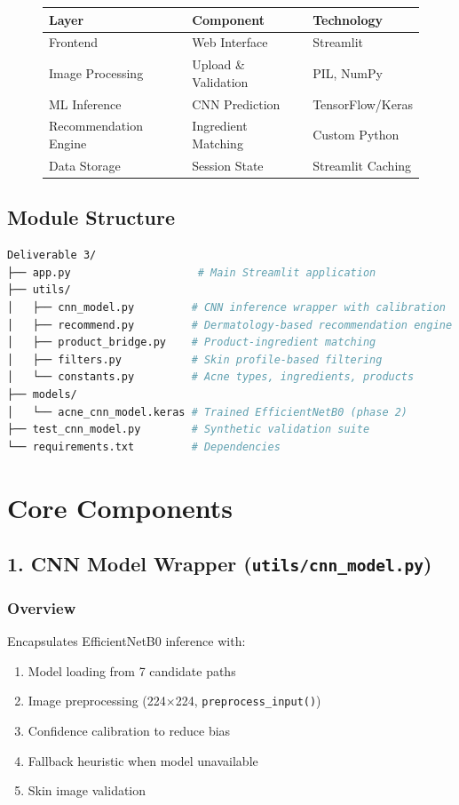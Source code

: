 \documentclass[12pt,a4paper]{article}
\begin{document}
\begin{figure}[H]
    \centering
    \begin{tabular}{|l|l|l|}
    \hline
    \textbf{Layer} & \textbf{Component} & \textbf{Technology} \\
    \hline
    Frontend & Web Interface & Streamlit \\
    Image Processing & Upload \& Validation & PIL, NumPy \\
    ML Inference & CNN Prediction & TensorFlow/Keras \\
    Recommendation Engine & Ingredient Matching & Custom Python \\
    Data Storage & Session State & Streamlit Caching \\
    \hline
    \end{tabular}
\end{figure}

\subsection{Module Structure}

\begin{lstlisting}[language=bash]
Deliverable 3/
├── app.py                    # Main Streamlit application
├── utils/
│   ├── cnn_model.py         # CNN inference wrapper with calibration
│   ├── recommend.py         # Dermatology-based recommendation engine
│   ├── product_bridge.py    # Product-ingredient matching
│   ├── filters.py           # Skin profile-based filtering
│   └── constants.py         # Acne types, ingredients, products
├── models/
│   └── acne_cnn_model.keras # Trained EfficientNetB0 (phase 2)
├── test_cnn_model.py        # Synthetic validation suite
└── requirements.txt         # Dependencies
\end{lstlisting}

\section{Core Components}

\subsection{1. CNN Model Wrapper (\texttt{utils/cnn\_model.py})}

\subsubsection{Overview}
Encapsulates EfficientNetB0 inference with:
\begin{enumerate}
    \item Model loading from 7 candidate paths
    \item Image preprocessing (224×224, \texttt{preprocess\_input()})
    \item Confidence calibration to reduce bias
    \item Fallback heuristic when model unavailable
    \item Skin image validation
\end{enumerate}
\end{document}
